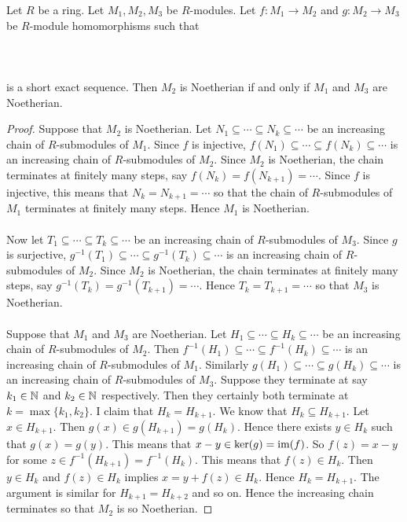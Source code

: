 \documentclass[a4paper]{article}
\begin{document}
\begin{prp}{}{} Let $R$ be a ring. Let $M_1,M_2,M_3$ be $R$-modules. Let $f:M_1\to M_2$ and $g:M_2\to M_3$ be $R$-module homomorphisms such that \\~\\
\\~\\
is a short exact sequence. Then $M_2$ is Noetherian if and only if $M_1$ and $M_3$ are Noetherian. 
\begin{proof}
Suppose that $M_2$ is Noetherian. Let $N_1\subseteq\cdots\subseteq N_k\subseteq\cdots$ be an increasing chain of $R$-submodules of $M_1$. Since $f$ is injective, $f(N_1)\subseteq\cdots\subseteq f(N_k)\subseteq\cdots$ is an increasing chain of $R$-submodules of $M_2$. Since $M_2$ is Noetherian, the chain terminates at finitely many steps, say $f(N_k)=f(N_{k+1})=\cdots$. Since $f$ is injective, this means that $N_k=N_{k+1}=\cdots$ so that the chain of $R$-submodules of $M_1$ terminates at finitely many steps. Hence $M_1$ is Noetherian. \\~\\

Now let $T_1\subseteq\cdots\subseteq T_k\subseteq\cdots$ be an increasing chain of $R$-submodules of $M_3$. Since $g$ is surjective, $g^{-1}(T_1)\subseteq\cdots\subseteq g^{-1}(T_k)\subseteq\cdots$ is an increasing chain of $R$-submodules of $M_2$. Since $M_2$ is Noetherian, the chain terminates at finitely many steps, say $g^{-1}(T_k)=g^{-1}(T_{k+1})=\cdots$. Hence $T_k=T_{k+1}=\cdots$ so that $M_3$ is Noetherian. \\~\\

Suppose that $M_1$ and $M_3$ are Noetherian. Let $H_1\subseteq\cdots\subseteq H_k\subseteq\cdots$ be an increasing chain of $R$-submodules of $M_2$. Then $f^{-1}(H_1)\subseteq\cdots\subseteq f^{-1}(H_k)\subseteq\cdots$ is an increasing chain of $R$-submodules of $M_1$. Similarly $g(H_1)\subseteq\cdots\subseteq g(H_k)\subseteq\cdots$ is an increasing chain of $R$-submodules of $M_3$. Suppose they terminate at say $k_1\in\mathbb{N}$ and $k_2\in\mathbb{N}$ respectively. Then they certainly both terminate at $k=\max\{k_1,k_2\}$. I claim that $H_k=H_{k+1}$. We know that $H_k\subseteq H_{k+1}$. Let $x\in H_{k+1}$. Then $g(x)\in g(H_{k+1})=g(H_k)$. Hence there exists $y\in H_k$ such that $g(x)=g(y)$. This means that $x-y\in\ker(g)=\operatorname{im}(f)$. So $f(z)=x-y$ for some $z\in f^{-1}(H_{k+1})=f^{-1}(H_k)$. This means that $f(z)\in H_k$. Then $y\in H_k$ and $f(z)\in H_k$ implies $x=y+f(z)\in H_k$. Hence $H_k=H_{k+1}$. The argument is similar for $H_{k+1}=H_{k+2}$ and so on. Hence the increasing chain terminates so that $M_2$ is so Noetherian. 
\end{proof}
\end{prp}
\end{document}
